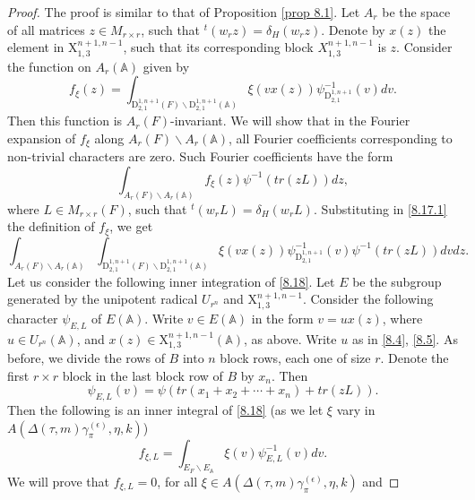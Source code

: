 \documentclass[12pts]{amsart}
\newcommand{\BA}{{\mathbb {A}}}
\begin{document}
\begin{proof}
	The proof is similar to that of Proposition \ref{prop 8.1}. Let $A_r$ be the space of all matrices $z\in M_{r\times r}$,
	such that ${}^t(w_rz)=\delta_H(w_rz)$. Denote by $x(z)$ the element in
	$\mathrm{X}_{1,3}^{n+1,n-1}$, such that its corresponding block
	$X_{1,3}^{n+1,n-1}$ is $z$. Consider the function on $A_r(\BA)$
	given by
	$$
	f_\xi(z)=\int_{\mathrm{D}_{2,1}^{1,n+1}(F)\backslash
		\mathrm{D}_{2,1}^{1,n+1}(\BA)}\xi(vx(z))\psi_{\mathrm{D}_{2,1}^{1,n+1}}^{-1}(v)dv.
	$$
	Then this function is $A_r(F)$-invariant. We will show that in the
	Fourier expansion of $f_\xi$ along $A_r(F)\backslash A_r(\BA)$,
	all Fourier coefficients corresponding to non-trivial characters are
	zero. Such Fourier coefficients have the form
	\begin{equation}\label{8.17.1}
	\int_{A_r(F)\backslash A_r(\BA)}f_\xi(z)\psi^{-1}(tr(zL))dz,
	\end{equation}
	where $L\in M_{r\times r}(F)$, such that ${}^t(w_rL)=\delta_H(w_rL)$.
	Substituting in \eqref{8.17.1} the definition of $f_\xi$, we get
	\begin{equation}\label{8.18}
	\int_{A_r(F)\backslash A_r(\BA)}\int_{\mathrm{D}_{2,1}^{1,n+1}(F)\backslash
		\mathrm{D}_{2,1}^{1,n+1}(\BA)}\xi(vx(z))\psi_{\mathrm{D}_{2,1}^{1,n+1}}^{-1}(v)\psi^{-1}(tr(zL))dvdz.
	\end{equation}
	Let us consider the following inner integration of \eqref{8.18}. Let
	$E$ be the subgroup generated by the unipotent radical $U_{r^n}$ and
	$\mathrm{X}_{1,3}^{n+1,n-1}$. Consider the following character
	$\psi_{E,L}$ of $E({\BA})$. Write $v\in E({\BA})$ in the form
	$v=ux(z)$, where $u\in U_{r^n}(\BA)$, and $x(z)\in
	\mathrm{X}_{1,3}^{n+1,n-1}(\BA)$, as above. Write $u$ as in
	\eqref{8.4}, \eqref{8.5}. As before, we divide the rows of
	$B$ into $n$ block rows, each one of size $r$. Denote the first
	$r\times r$ block in the last block row of $B$ by $x_n$. Then
	\begin{equation}\label{8.19}
	\psi_{E,L}(v)=\psi(tr(x_1+x_2+\cdots +x_n)+tr(zL)).
	\end{equation}
	Then the following is an inner integral of \eqref{8.18} (as we let $\xi$ vary in \\
	$A(\Delta(\tau,m)\gamma_\pi^{(\epsilon)},\eta,k)$)	                  
	\begin{equation}\label{8.20}
	f_{\xi,L}=\int_{E_F\backslash E_{\BA}}\xi(v)\psi^{-1}_{E,L}(v)dv.
	\end{equation}
	We will prove that $f_{\xi,L}=0$, for all $\xi\in A(\Delta(\tau,m)\gamma_\pi^{(\epsilon)},\eta,k)$ and

\end{proof}
\end{document}
